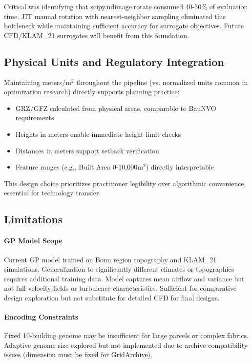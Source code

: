 \documentclass[times,final]{elsarticle}
\begin{document}
Critical was identifying that scipy.ndimage.rotate consumed 40-50\% of evaluation time. JIT manual rotation with nearest-neighbor sampling eliminated this bottleneck while maintaining sufficient accuracy for surrogate objectives. Future CFD/KLAM\_21 surrogates will benefit from this foundation.

\subsection{Physical Units and Regulatory Integration}

Maintaining meters/m$^2$ throughout the pipeline (vs. normalized units common in optimization research) directly supports planning practice:
\begin{itemize}
\item GRZ/GFZ calculated from physical areas, comparable to BauNVO requirements
\item Heights in meters enable immediate height limit checks
\item Distances in meters support setback verification
\item Feature ranges (e.g., Built Area 0-10,000m$^2$) directly interpretable
\end{itemize}

This design choice prioritizes practitioner legibility over algorithmic convenience, essential for technology transfer.

\subsection{Limitations}

\paragraph{GP Model Scope}
Current GP model trained on Bonn region topography and KLAM\_21 simulations. Generalization to significantly different climates or topographies requires additional training data. Model captures mean airflow and variance but not full velocity fields or turbulence characteristics. Sufficient for comparative design exploration but not substitute for detailed CFD for final designs.

\paragraph{Encoding Constraints}
Fixed 10-building genome may be insufficient for large parcels or complex fabrics. Adaptive genome size explored but not implemented due to archive compatibility issues (dimension must be fixed for GridArchive).
\end{document}
